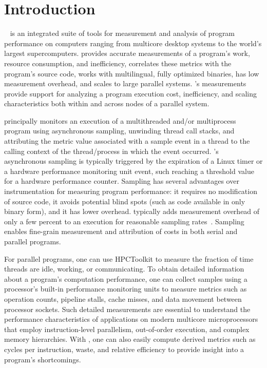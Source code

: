 \documentclass[11pt,letterpaper]{report}
\begin{document}

\newpage
\pagestyle{plain}
\setcounter{page}{1}

\chapter{Introduction}

\HPCToolkit{}~\cite{Adhianto-etal:2010:CPE-hpctoolkit,hpctoolkit-www} is an integrated suite of tools for measurement and analysis of program performance on computers ranging from multicore desktop systems to the world's largest supercomputers.
\HPCToolkit{} provides accurate measurements of a program's work, resource consumption, and inefficiency, correlates these metrics with the program's source code, works with multilingual, fully optimized binaries, has low measurement overhead, and scales to large parallel systems.
\HPCToolkit{}'s measurements provide support for analyzing a program execution cost, inefficiency, and scaling characteristics both within and across nodes of a parallel system.

\HPCToolkit{} principally monitors an execution of a multithreaded and/or multiprocess program using asynchronous sampling, unwinding thread call stacks, and attributing the metric value associated with a sample event in a thread to the calling context of the thread/process in which the event occurred. \HPCToolkit{}'s asynchronous sampling is typically triggered by the expiration of a Linux timer or a hardware performance monitoring unit event, such reaching a threshold value for a hardware performance counter.
Sampling has several advantages over instrumentation for measuring program performance: it requires no modification of source code, it avoids potential blind spots (such as code available in only binary form), and it has lower overhead.
\HPCToolkit{} typically adds measurement overhead of only a few percent to an execution for reasonable sampling rates~\cite{Tallent-MC-Fagan:2009:PLDI-hpctoolkit-binary-analysis}.
Sampling enables fine-grain measurement and attribution of costs in both serial and parallel programs. 

For parallel programs, one can use HPCToolkit to measure
the fraction of time threads are idle, working, or communicating.
To obtain detailed information about a program's computation
performance, one can collect samples using a processor's built-in performance monitoring
units to measure metrics such as
operation counts, pipeline stalls, cache misses, and data movement
between processor sockets.  Such detailed measurements are essential
to understand the performance characteristics of applications
on modern multicore microprocessors that employ instruction-level
parallelism, out-of-order execution, and complex memory hierarchies.
With \HPCToolkit{}, one can also easily compute derived metrics such as cycles
per instruction, waste, and relative efficiency to provide insight
into a program's shortcomings.
\end{document}
